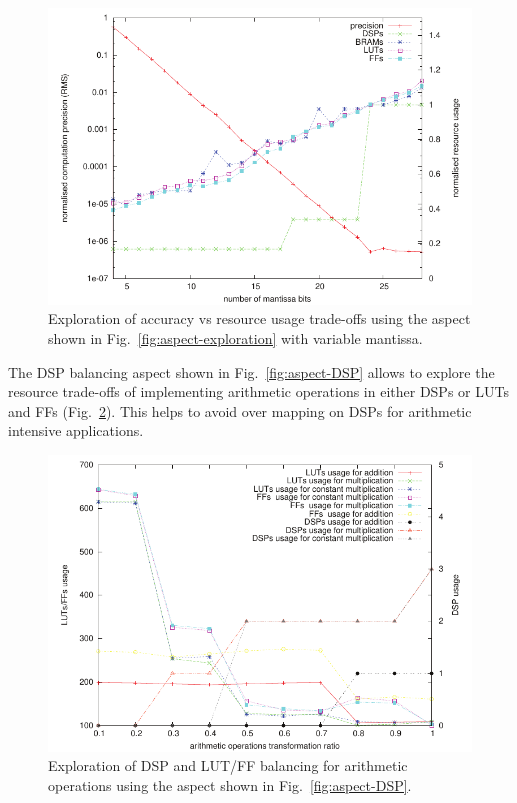 \begin{figure}[!h]
\includegraphics[scale=0.7]{figs/pre}
\caption{Exploration of accuracy vs resource usage trade-offs using the aspect
shown in Fig.~\ref{fig:aspect-exploration} with variable mantissa.}
\label{fig:precision}
  \vspace{-2mm}
\end{figure}

The DSP balancing aspect shown in Fig.~\ref{fig:aspect-DSP} allows to
explore the resource trade-offs of implementing arithmetic operations
in either DSPs or LUTs and FFs (Fig.~\ref{fig:arith}). This helps to
avoid over mapping on DSPs for arithmetic intensive applications.

\begin{figure}[!h]
\includegraphics[scale=0.7]{figs/arith}
\caption{Exploration of DSP and LUT/FF balancing for arithmetic
  operations using the aspect shown in Fig.~\ref{fig:aspect-DSP}.}
\label{fig:arith}
  \vspace{-2mm}
\end{figure}


